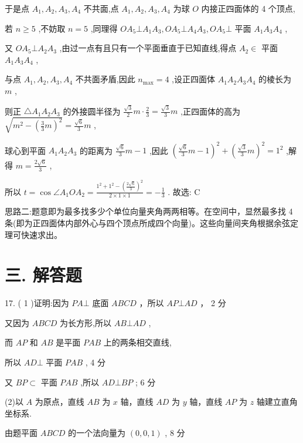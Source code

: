 \documentclass[10pt]{article}
\begin{document}
于是点 \({A}_{1},{A}_{2},{A}_{3},{A}_{4}\) 不共面,点 \({A}_{1},{A}_{2},{A}_{3},{A}_{4}\) 为球 \(O\) 内接正四面体的 4 个顶点,

若 \(n \geq  5\) ,不妨取 \(n = 5\) ,同理得 \(O{A}_{5} \bot  {A}_{1}{A}_{3},O{A}_{5} \bot  {A}_{4}{A}_{3},O{A}_{5} \bot\) 平面 \({A}_{1}{A}_{3}{A}_{4}\) ,

又 \(O{A}_{5} \bot  {A}_{2}{A}_{3}\) ,由过一点有且只有一个平面垂直于已知直线,得点 \({A}_{2} \in\) 平面 \({A}_{1}{A}_{3}{A}_{4}\) ,

与点 \({A}_{1},{A}_{2},{A}_{3},{A}_{4}\) 不共面矛盾,因此 \({n}_{\max } = 4\) ,设正四面体 \({A}_{1}{A}_{2}{A}_{3}{A}_{4}\) 的棱长为 \(m\) ,

则正 \(\bigtriangleup {A}_{1}{A}_{2}{A}_{3}\) 的外接圆半径为 \(\frac{\sqrt{3}}{2}m \cdot  \frac{2}{3} = \frac{\sqrt{3}}{3}m\) ,正四面体的高为 \(\sqrt{{m}^{2} - {\left( \frac{3}{3}m\right) }^{2}} = \frac{\sqrt{6}}{3}m\) ,

球心到平面 \({A}_{1}{A}_{2}{A}_{3}\) 的距离为 \(\frac{\sqrt{6}}{3}m - 1\) ,因此 \({\left( \frac{\sqrt{6}}{3}m - 1\right) }^{2} + {\left( \frac{\sqrt{3}}{3}m\right) }^{2} = {1}^{2}\) ,解得 \(m = \frac{2\sqrt{6}}{3}\) ,

所以 \(t = \cos \angle {A}_{1}O{A}_{2} = \frac{{1}^{2} + {1}^{2} - {\left( \frac{2\sqrt{6}}{3}\right) }^{2}}{2 \times  1 \times  1} =  - \frac{1}{3}\) . 故选: C

思路二:题意即为最多找多少个单位向量夹角两两相等。在空间中，显然最多找 4 条(即为正四面体内部外心与四个顶点所成四个向量)。这些向量间夹角根据余弦定理可快速求出。

\section*{三. 解答题}

17. ( 1 )证明:因为 \({PA} \bot\) 底面 \({ABCD}\) ，所以 \({AP} \bot  {AD}\) ， 2 分

又因为 \({ABCD}\) 为长方形,所以 \({AB} \bot  {AD}\) ,

而 \({AP}\) 和 \({AB}\) 是平面 \({PAB}\) 上的两条相交直线,

所以 \({AD} \bot\) 平面 \({PAB}\) , 4 分

又 \({BP} \subset\) 平面 \({PAB}\) ,所以 \({AD} \bot  {BP}\) ; 6 分

(2)以 \(A\) 为原点，直线 \({AB}\) 为 \(x\) 轴，直线 \({AD}\) 为 \(y\) 轴，直线 \({AP}\) 为 \(z\) 轴建立直角坐标系.

由题平面 \({ABCD}\) 的一个法向量为 \(\left( {0,0,1}\right)\) , 8 分
\end{document}
